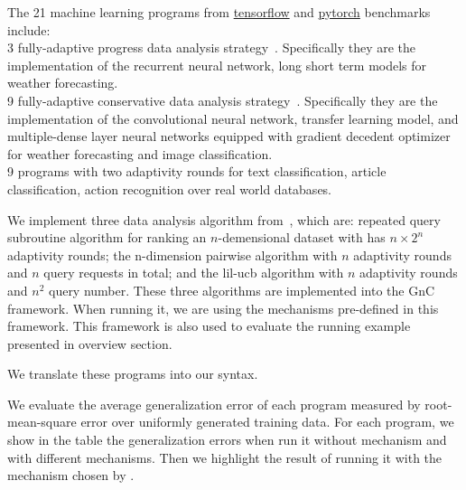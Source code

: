 The 21 machine learning programs
from \hyperlink{https://github.com/tensorflow/tensorflow/tree/master/tensorflow/examples}{tensorflow}
and \hyperlink{https://github.com/pytorch/pytorch}{pytorch}
benchmarks include:
\\
3 fully-adaptive progress data analysis
strategy~\cite{ZrnicH19}.
Specifically they are the implementation of the recurrent neural network, long short term models for 
weather forecasting.
\\
9
fully-adaptive conservative data analysis
strategy~\cite{ZrnicH19}.
Specifically they are the implementation of the convolutional neural network, transfer learning model,
and multiple-dense layer neural networks equipped with gradient decedent optimizer for
weather forecasting and image classification.
\\
9 programs with two adaptivity rounds for text classification,
article classification, action recognition over real world databases.

We implement three data analysis algorithm from~\cite{Jamieson2015TheAO},
which are:
repeated query subroutine algorithm for ranking
an $n$-demensional dataset with
has $n\times 2^n$ adaptivity rounds;
the n-dimension pairwise algorithm with $n$ adaptivity rounds and $n$ query requests in total;
and the lil-ucb algorithm with $n$ adaptivity rounds and $n^2$ query number.
These three algorithms are implemented into the GnC framework.
When running it, we are using the mechanisms pre-defined in this framework.
This framework is also used to evaluate the running example presented in overview section.

We translate these programs into our syntax.

We evaluate the average generalization error of each program measured by root-mean-square error over uniformly generated training data.
For each program, we show in the table the generalization errors when run it without mechanism and with different mechanisms.
Then we highlight the result of running it with the mechanism chosen by {\THESYSTEM}.




% 
